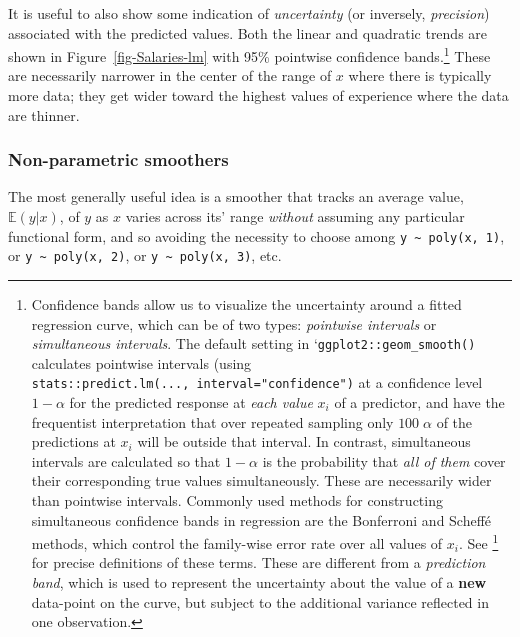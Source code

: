 \documentclass[
  letterpaper,
  10pt,
  krantz2]{krantz}
\providecommand{\href}[2]{#2\footnote{\url{#1}}}
\begin{document}
It is useful to also show some indication of \emph{uncertainty} (or
inversely, \emph{precision}) associated with the predicted values. Both
the linear and quadratic trends are shown in
Figure~\ref{fig-Salaries-lm} with 95\% pointwise confidence
bands.\footnote{Confidence bands allow us to visualize the uncertainty
  around a fitted regression curve, which can be of two types:
  \emph{pointwise intervals} or \emph{simultaneous intervals}. The
  default setting in `\texttt{ggplot2::geom\_smooth()} calculates
  pointwise intervals (using
  \texttt{stats::predict.lm(...,\ interval="confidence")} at a
  confidence level \(1-\alpha\) for the predicted response at \emph{each
  value} \(x_i\) of a predictor, and have the frequentist interpretation
  that over repeated sampling only \(100\;\alpha\) of the predictions at
  \(x_i\) will be outside that interval. In contrast, simultaneous
  intervals are calculated so that \(1 - \alpha\) is the probability
  that \emph{all of them} cover their corresponding true values
  simultaneously. These are necessarily wider than pointwise intervals.
  Commonly used methods for constructing simultaneous confidence bands
  in regression are the Bonferroni and Scheffé methods, which control
  the family-wise error rate over all values of \(x_i\). See
  \href{https://en.wikipedia.org/wiki/Confidence_and_prediction_bands}{}
  for precise definitions of these terms. These are different from a
  \emph{prediction band}, which is used to represent the uncertainty
  about the value of a \textbf{new} data-point on the curve, but subject
  to the additional variance reflected in one observation.} These are
necessarily narrower in the center of the range of \(x\) where there is
typically more data; they get wider toward the highest values of
experience where the data are thinner.

\subsubsection*{Non-parametric
smoothers}\label{non-parametric-smoothers}

The most generally useful idea is a smoother that tracks an average
value, \(\mathbb{E} (y | x)\), of \(y\) as \(x\) varies across its'
range \emph{without} assuming any particular functional form, and so
avoiding the necessity to choose among
\texttt{y\ \textasciitilde{}\ poly(x,\ 1)}, or
\texttt{y\ \textasciitilde{}\ poly(x,\ 2)}, or
\texttt{y\ \textasciitilde{}\ poly(x,\ 3)}, etc.
\end{document}

